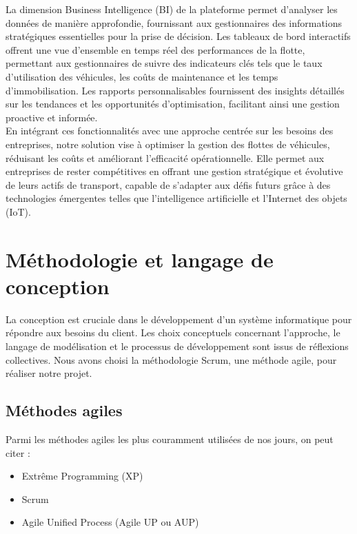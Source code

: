 La dimension Business Intelligence (BI) de la plateforme permet d’analyser les données de manière approfondie, fournissant aux gestionnaires des informations stratégiques essentielles pour la prise de décision. Les tableaux de bord interactifs offrent une vue d’ensemble en temps réel des performances de la flotte, permettant aux gestionnaires de suivre des indicateurs clés tels que le taux d’utilisation des véhicules, les coûts de maintenance et les temps d’immobilisation. Les rapports personnalisables fournissent des insights détaillés sur les tendances et les opportunités d’optimisation, facilitant ainsi une gestion proactive et informée.\\

En intégrant ces fonctionnalités avec une approche centrée sur les besoins des entreprises, notre solution vise à optimiser la gestion des flottes de véhicules, réduisant les coûts et améliorant l’efficacité opérationnelle. Elle permet aux entreprises de rester compétitives en offrant une gestion stratégique et évolutive de leurs actifs de transport, capable de s’adapter aux défis futurs grâce à des technologies émergentes telles que l’intelligence artificielle et l’Internet des objets (IoT).\\




\section{Méthodologie et langage de conception}
La conception est cruciale dans le développement d'un système informatique pour répondre aux besoins du client. Les choix conceptuels concernant l'approche, le langage de modélisation et le processus de développement sont issus de réflexions collectives. Nous avons choisi la méthodologie Scrum, une méthode agile, pour réaliser notre projet.
\subsection { Méthodes agiles}
\noindent Parmi les méthodes agiles les plus couramment utilisées de nos jours, on peut citer :

\begin{itemize}[label=$\square$]
    \item Extrême Programming (XP)
    \item Scrum
    \item Agile Unified Process (Agile UP ou AUP)
\end{itemize}


